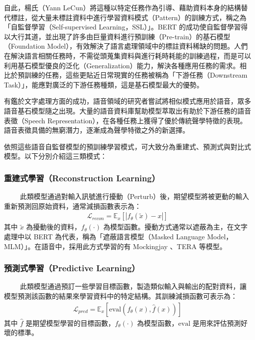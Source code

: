 自此，楊氏（Yann LeCun）將這種以特定任務作為引導、藉助資料本身的結構替代標註，從大量未標註資料中進行學習資料模式（Pattern）的訓練方式，稱之為「自監督學習（Self-supervised Learning，SSL）」。BERT 的成功使自監督學習得以大行其道，並出現了許多由巨量資料進行預訓練（Pre-train）的基石模型（Foundation Model），有效解決了語言處理領域中的標註資料稀缺的問題。人們在解決語言相關任務時，不需從頭蒐集資料與進行耗時耗能的訓練過程，而是可以利用基石模型優良的泛化（Generalization）能力，解決各種應用任務的需求。相比於預訓練的任務，這些更貼近日常現實的任務被稱為「下游任務（Downstream Task）」，能應對廣泛的下游任務種類，這是基石模型最大的優勢。

有鑑於文字處理方面的成功，語音領域的研究者嘗試將相似模式應用於語音，眾多語音基石模型隨之出現。大量的語音資料庫幫助模型萃取出有助於下游任務的語音表徵（Speech Representation），在各種任務上獲得了優於傳統聲學特徵的表現。語音表徵具備的無窮潛力，逐漸成為聲學特徵之外的新選擇。

依照這些語音自監督模型的預訓練學習模式，可大致分為重建式、預測式與對比式模型。以下分別介紹這三類模式：

\subsubsection{重建式學習（Reconstruction Learning）}
　　
此類模型通過對輸入訊號進行擾動（Perturb）後，期望模型將被更動的輸入重新預測回原始資料，通常減損函數表示為：
\begin{align}
    \mathcal{L}_{recon} = \mathbb{E}_x[|f_\theta(\tilde{x}) - x|]
\end{align}
其中 $\tilde{x}$ 為擾動後的資料，$f_\theta(\cdot)$ 為模型函數。擾動方式通常以遮蔽為主，在文字處理中以 BERT 為代表，稱為「遮蔽語言模型（Masked Language Model，MLM）」。在語音中，採用此方式學習的有 Mockingjay \cite{liu_mockingjay_2019}、TERA \cite{t_tera_2021} 等模型。  %

\subsubsection{預測式學習（Predictive Learning）}
　　
此類模型通過預訂一些學習目標函數，製造類似輸入與輸出的配對資料，讓模型預測該函數的結果來學習資料中的特定結構。其訓練減損函數可表示為：
\begin{align}
    \mathcal{L}_{pred} = \mathbb{E}_x[\text{eval}(f_\theta(x), \hat{f}(x))]
\end{align}
其中 $\hat{f}$ 是期望模型學習的目標函數，$f_\theta(\cdot)$ 為模型函數，$\text{eval}$ 是用來評估預測好壞的標準。

